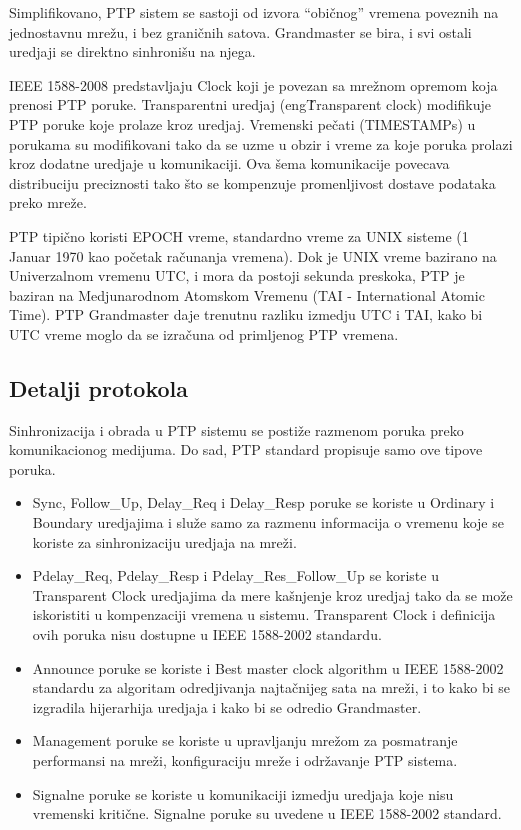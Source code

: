 \documentclass[a4paper,12pt, master]{etf}
\begin{document}
    Simplifikovano, PTP sistem se sastoji od izvora ``obi\v{c}nog'' vremena
    poveznih na jednostavnu mre\v{z}u, i bez grani\v{c}nih satova. Grandmaster
    se bira, i svi ostali uredjaji se direktno sinhroni\v{s}u na njega.

	IEEE 1588-2008 predstavljaju Clock koji je povezan sa mre\v{z}nom opremom
    koja prenosi PTP poruke.  Transparentni uredjaj (eng\. Transparent clock)
	modifikuje PTP poruke koje prolaze kroz uredjaj. Vremenski pe\v{c}ati
	(TIMESTAMPs) u porukama su modifikovani tako da se uzme u obzir i vreme za
	koje poruka prolazi kroz dodatne uredjaje u komunikaciji. Ova \v{s}ema
	komunikacije povecava distribuciju preciznosti tako \v{s}to se kompenzuje
	promenljivost dostave podataka preko mre\v{z}e.

	PTP tipi\v{c}no koristi EPOCH vreme, standardno vreme za UNIX sisteme (1
	Januar 1970 kao po\v{c}etak ra\v{c}unanja vremena). Dok je UNIX vreme
	bazirano na Univerzalnom vremenu UTC, i mora da postoji sekunda preskoka,
    PTP je baziran na Medjunarodnom Atomskom Vremenu (TAI - International Atomic
    Time). PTP Grandmaster daje trenutnu razliku izmedju UTC i TAI, kako bi UTC
    vreme moglo da se izra\v{c}una od primljenog PTP vremena.

	\subsection{Detalji protokola}

	Sinhronizacija i obrada u PTP sistemu se posti\v{z}e razmenom poruka preko
	komunikacionog medijuma. Do sad, PTP standard propisuje samo ove tipove
	poruka.

	\begin{itemize}
		\item Sync, Follow\_Up, Delay\_Req i Delay\_Resp poruke se koriste u
		Ordinary i Boundary uredjajima i slu\v{z}e samo za razmenu informacija
		o vremenu koje se koriste za sinhronizaciju uredjaja na mre\v{z}i.
		\item Pdelay\_Req, Pdelay\_Resp i Pdelay\_Res\_Follow\_Up se koriste u
		Transparent Clock uredjajima da mere ka\v{s}njenje kroz uredjaj tako da
		se mo\v{z}e iskoristiti u kompenzaciji vremena u sistemu. Transparent
		Clock i definicija ovih poruka nisu dostupne u IEEE 1588-2002 standardu.
		\item Announce poruke se koriste i Best master clock algorithm u IEEE
		1588-2002 standardu za algoritam odredjivanja najta\v{c}nijeg sata na
		mre\v{z}i, i to kako bi se izgradila hijerarhija uredjaja i kako bi se
		odredio Grandmaster.
		\item Management poruke se koriste u upravljanju mre\v{z}om za
		posmatranje performansi na mre\v{z}i, konfiguraciju mre\v{z}e i
		odr\v{z}avanje PTP sistema.
		\item Signalne poruke se koriste u komunikaciji izmedju uredjaja koje
		nisu vremenski kriti\v{c}ne. Signalne poruke su uvedene u IEEE
		1588-2002 standard.
	\end{itemize}
\end{document}
